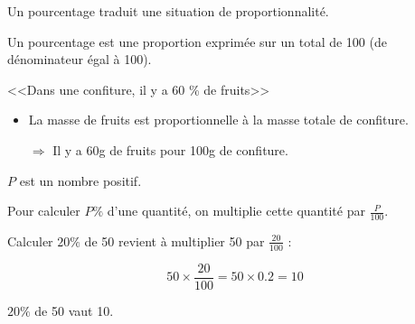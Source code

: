 \documentclass[12pt,a4paper]{article}
\begin{document}

\begin{mydef}
	Un pourcentage traduit une situation de proportionnalité. 

	Un pourcentage est une proportion exprimée sur un total de 100 (de dénominateur égal à 100).
	
\end{mydef}

\begin{myex}
	<<Dans une confiture, il y a 60 \% de fruits>>
	\begin{itemize}
		\item La masse de fruits est proportionnelle à la masse totale de confiture.
		\item[$\Rightarrow$] Il y a 60g de fruits pour 100g de confiture.
	\end{itemize}
\end{myex}


\begin{myprop}
	$P$ est un nombre positif.
	
	Pour calculer $P\% $ d'une quantité, on multiplie cette quantité par $\frac{P}{100}$.
\end{myprop}


\begin{myex}
	Calculer $20 \% $ de 50 revient à multiplier 50 par $\frac{20}{100}$ :
	
	\begin{equation*}
		50 \times \dfrac{20}{100} = 50 \times \num{0.2} = 10
	\end{equation*}
	
	
	$20 \% $ de 50  vaut 10.
\end{myex}
\end{document}
